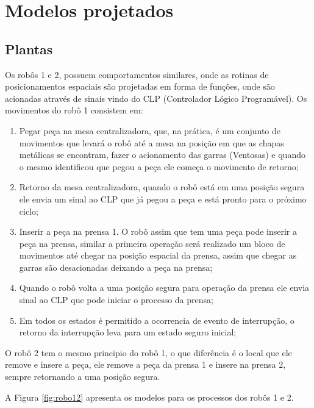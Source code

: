 \section{Modelos projetados}
\subsection{Plantas}
Os robôs 1 e 2, possuem comportamentos similares, onde as rotinas de posicionamentos espaciais são projetadas em forma de funções, onde são acionadas através de sinais vindo do CLP (Controlador Lógico Programável).
Os movimentos do robô 1 consistem em:

\begin{enumerate}
  \item Pegar peça na mesa centralizadora, que, na prática, é um conjunto de movimentos que levará o robô até a mesa na posição em que as chapas metálicas se encontram, fazer o acionamento das garras (Ventosas) e quando o mesmo identificou que pegou a peça ele começa o movimento de retorno;
  \item Retorno da mesa centralizadora, quando o robô está em uma posição segura ele envia um sinal ao CLP que já pegou a peça e está pronto para o próximo ciclo;
  \item Inserir a peça na prensa 1. O robô assim que tem uma peça pode inserir a peça na prensa, similar a primeira operação será realizado um bloco de movimentos até chegar na posição espacial da prensa, assim que chegar as garras são desacionadas deixando a peça na prensa;
  \item Quando o robô volta a uma posição segura para operação da prensa ele envia sinal ao CLP que pode iniciar o processo da prensa;
  \item Em todos os estados é permitido a ocorrencia de evento de interrupção, o retorno da interrupção leva para um estado seguro inicial;
\end{enumerate}

O robô 2 tem o mesmo principio do robô 1, o que diferência é o local que ele remove e insere a peça, ele remove a peça da prensa 1 e insere na prensa 2, sempre retornando a uma posição segura.

A Figura \ref{fig:robo12} apresenta os modelos para os processos dos robôs 1 e 2.

